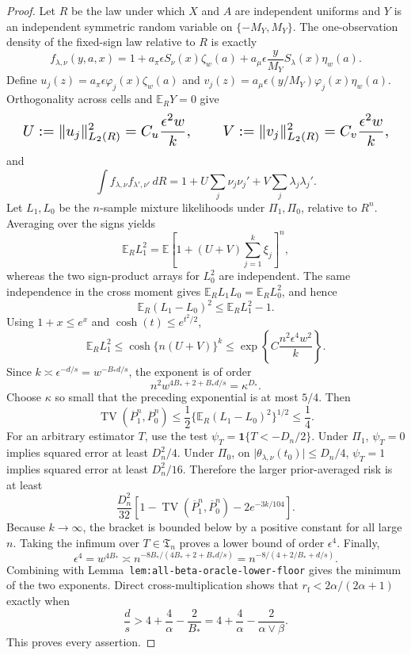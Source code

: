 \documentclass{article}
\begin{document}
\begin{proof}
Let \(R\) be the law under which \(X\) and \(A\) are independent uniforms and \(Y\) is an independent symmetric random variable on \(\{-M_Y,M_Y\}\). The one-observation density of the fixed-sign law relative to \(R\) is exactly
\[
f_{\lambda,\nu}(y,a,x)=1+a_\pi\epsilon S_\nu(x)\zeta_w(a)+a_\mu\epsilon\frac{y}{M_Y}S_\lambda(x)\eta_w(a).
\]
Define \(u_j(z)=a_\pi\epsilon\varphi_j(x)\zeta_w(a)\) and \(v_j(z)=a_\mu\epsilon(y/M_Y)\varphi_j(x)\eta_w(a)\). Orthogonality across cells and \(\mathbb E_RY=0\) give
\[
\makebox[\linewidth][c]{\resizebox{0.98\linewidth}{!}{\par\noindent \makebox[\linewidth][c]{\resizebox{0.98\linewidth}{!}{\(\displaystyle \displaystyle U:=\lVert u_j\rVert_{L_2(R)}^2=C_u\frac{\epsilon^2w}{k},\qquad V:=\lVert v_j\rVert_{L_2(R)}^2=C_v\frac{\epsilon^2w}{k},\)}}\par\noindent}}
\]
and
\[
\int f_{\lambda,\nu}f_{\lambda',\nu'}\,dR=1+U\sum_j\nu_j\nu_j'+V\sum_j\lambda_j\lambda_j'.
\]
Let \(L_1,L_0\) be the \(n\)-sample mixture likelihoods under \(\Pi_1,\Pi_0\), relative to \(R^n\). Averaging over the signs yields
\[
\mathbb E_RL_1^2=\mathbb E\left[1+(U+V)\sum_{j=1}^k\xi_j\right]^n,
\]
whereas the two sign-product arrays for \(L_0^2\) are independent. The same independence in the cross moment gives \(\mathbb E_RL_1L_0=\mathbb E_RL_0^2\), and hence
\[
\mathbb E_R(L_1-L_0)^2\le\mathbb E_RL_1^2-1.
\]
Using \(1+x\le e^x\) and \(\cosh(t)\le e^{t^2/2}\),
\[
\mathbb E_RL_1^2\le\cosh\{n(U+V)\}^k\le\exp\left\{C\frac{n^2\epsilon^4w^2}{k}\right\}.
\]
Since \(k\asymp\epsilon^{-d/s}=w^{-B_*d/s}\), the exponent is of order
\[
n^2w^{4B_*+2+B_*d/s}=\kappa^{D_*}.
\]
Choose \(\kappa\) so small that the preceding exponential is at most \(5/4\). Then
\[
\operatorname{TV}(\overline P_1^n,\overline P_0^n)\le\frac12\{\mathbb E_R(L_1-L_0)^2\}^{1/2}\le\frac14.
\]
For an arbitrary estimator \(T\), use the test \(\psi_T=\mathbf1\{T<-D_n/2\}\). Under \(\Pi_1\), \(\psi_T=0\) implies squared error at least \(D_n^2/4\). Under \(\Pi_0\), on \(\lvert\theta_{\lambda,\nu}(t_0)\rvert\le D_n/4\), \(\psi_T=1\) implies squared error at least \(D_n^2/16\). Therefore the larger prior-averaged risk is at least
\[
\frac{D_n^2}{32}\left[1-\operatorname{TV}(\overline P_1^n,\overline P_0^n)-2e^{-3k/104}\right].
\]
Because \(k\to\infty\), the bracket is bounded below by a positive constant for all large \(n\). Taking the infimum over \(T\in\mathfrak T_n\) proves a lower bound of order \(\epsilon^4\). Finally,
\[
\epsilon^4=w^{4B_*}\asymp n^{-8B_*/(4B_*+2+B_*d/s)}=n^{-8/(4+2/B_*+d/s)}.
\]
Combining with Lemma~\texttt{lem:all-beta-oracle-lower-floor} gives the minimum of the two exponents. Direct cross-multiplication shows that \(r_{\mathrm f}<2\alpha/(2\alpha+1)\) exactly when
\[
\frac ds>4+\frac4\alpha-\frac2{B_*}=4+\frac4\alpha-\frac2{\alpha\vee\beta}.
\]
This proves every assertion.
\end{proof}
\end{document}
